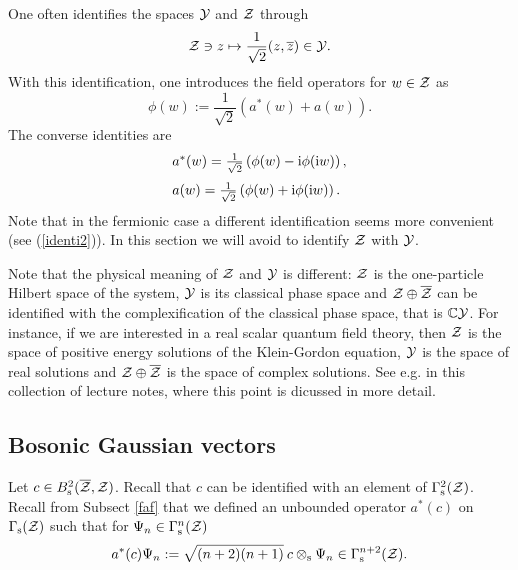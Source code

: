 \documentclass{svmult}
\newcommand{\beq}{\begin{equation}}
\newcommand{\eeq}{\end{equation}}
\def\cc{{\mathbb C}}
\def\Re{{\rm Re}}
\def\bar{\overline}
\def\s{{\rm s}}
\def\cZ{{\cal Z}}
\def\cY{{\cal Y}}
\def\cS{{\cal S}}
\def\i{{\rm i}}
\def\d{{\rm d}}
\def\ii{ j }
\def\cG{{\cal G}}
\def\d{{\rm d}}
\def\s{{\rm s}}
\begin{document}


One often identifies the spaces $\cY$ and $\cZ$ through
\beq \cZ\ni z\mapsto\frac1{\sqrt2}(z,\bar z)\in\cY.\label{identi1}\eeq
With this identification, one introduces the field operators for $w\in\cZ$ as
\[\phi(w):=\frac{1}{\sqrt2}\left(a^*(w)+a(w)\right).\]
The converse identities are
\[\begin{array}{l}
a^*(w)=\frac{1}{\sqrt2}\left(\phi(w)-\i\phi(\i w)\right),\\[3mm]
a(w)=\frac{1}{\sqrt2}\left(\phi(w)+\i\phi(\i w)\right).
\end{array}\]
Note
 that in the fermionic case a different identification seems more convenient
(see (\ref{identi2})).
In this section we will avoid to  identify $\cZ$ with $\cY$. 

Note that the
physical meaning of $\cZ$ and $\cY$ is different: $\cZ$ is the one-particle
Hilbert space of the system, $\cY$ is its classical phase space and
$\cZ\oplus\bar\cZ$ can be identified with the complexification of the
classical phase space, that is $\cc\cY$.
For instance, if we are interested in  a real 
scalar quantum field theory, then
$\cZ$ is the space of positive energy solutions of the Klein-Gordon equation,
 $\cY$ is the space of real solutions and $\cZ\oplus\bar\cZ$ is the space of
complex solutions.
See e.g. \cite{DB} in this collection of lecture notes, where this point is
dicussed in more detail.




\subsection{Bosonic Gaussian vectors}
\label{squee1}




Let $c\in B_\s^2(\bar\cZ,\cZ)$. Recall that $c$ can be identified with an
 element of $\Gamma_\s^2(\cZ)$. Recall from Subsect \ref{faf} that we 
 defined an unbounded  operator $a^*(c)$ on $\Gamma_\s(\cZ)$ such that
for $\Psi_n\in\Gamma_\s^n(\cZ)$
\begin{equation} a^*(c)\Psi_n:=\sqrt{(n+2)(n+1)}\:c\otimes_\s\Psi_n
\in\Gamma_\s^{n+2}(\cZ). 
\label{ccca}\end{equation}
\end{document}
